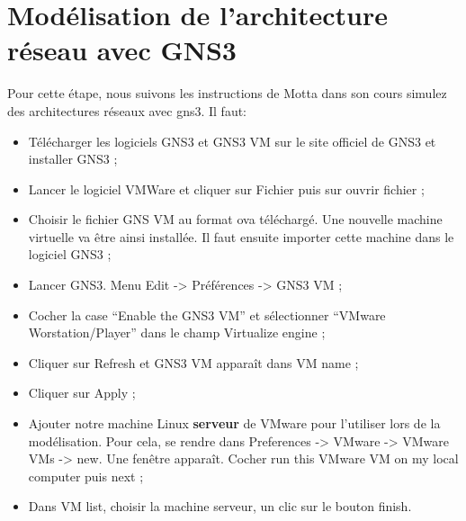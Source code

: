 \documentclass[a4paper,12pt,french]{report} %
\begin{document}
\section{Modélisation de l'architecture réseau avec GNS3}
Pour cette étape, nous suivons les instructions de Motta dans son cours simulez des architectures réseaux avec gns3.
Il faut: 
\begin{itemize}
	\item Télécharger les logiciels GNS3  et GNS3 VM sur le site officiel de GNS3 et installer GNS3 ;
	\item Lancer le logiciel VMWare et cliquer sur Fichier puis sur  ouvrir fichier ;
	\item Choisir le fichier GNS VM au format ova téléchargé. Une nouvelle machine virtuelle va être ainsi installée. Il faut ensuite importer cette machine dans le logiciel GNS3 ;
	\item Lancer  GNS3. Menu Edit -> Préférences -> GNS3 VM ;
	\item Cocher la case  “Enable the GNS3 VM” et sélectionner “VMware Worstation/Player” dans le champ Virtualize engine ;
	\item Cliquer sur Refresh et GNS3 VM apparaît dans VM name ;
	\item Cliquer sur Apply ;
	\item Ajouter notre machine Linux \textbf{serveur} de VMware pour l'utiliser lors de la modélisation. Pour cela, se rendre dans Preferences -> VMware -> VMware VMs -> new. Une fenêtre apparaît. Cocher run this VMware VM on my local computer puis next ;
	\item Dans VM list, choisir la machine serveur, un clic sur le bouton finish.
\end{itemize}
\end{document}
